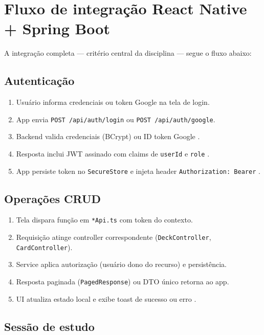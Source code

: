 \section{Fluxo de integração React Native + Spring Boot}

A integração completa --- critério central da disciplina --- segue o fluxo abaixo:

\subsection{Autenticação}

\begin{enumerate}
    \item Usuário informa credenciais ou token Google na tela de login.
    \item App envia \texttt{POST /api/auth/login} ou \texttt{POST /api/auth/google}.
    \item Backend valida credenciais (BCrypt) ou ID token Google \cite{google_oauth,bcrypt_spring}.
    \item Resposta inclui JWT assinado com claims de \texttt{userId} e \texttt{role} \cite{jwt_io}.
    \item App persiste token no \texttt{SecureStore} e injeta header \texttt{Authorization: Bearer} \cite{expo_secure_store,mdn_fetch}.
\end{enumerate}

\subsection{Operações CRUD}

\begin{enumerate}
    \item Tela dispara função em \texttt{*Api.ts} com token do contexto.
    \item Requisição atinge controller correspondente (\texttt{DeckController}, \texttt{CardController}).
    \item Service aplica autorização (usuário dono do recurso) e persistência.
    \item Resposta paginada (\texttt{PagedResponse}) ou DTO único retorna ao app.
    \item UI atualiza estado local e exibe toast de sucesso ou erro \cite{toast_message_rn}.
\end{enumerate}

\subsection{Sessão de estudo}

